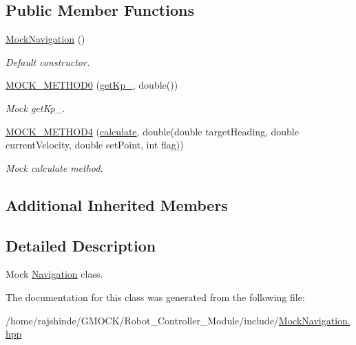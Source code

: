 \subsection*{Public Member Functions}
\begin{DoxyCompactItemize}
\item 
\hyperlink{class_mock_navigation_a54759f67f52b03841f44efe7926fff22}{Mock\+Navigation} ()\hypertarget{class_mock_navigation_a54759f67f52b03841f44efe7926fff22}{}\label{class_mock_navigation_a54759f67f52b03841f44efe7926fff22}

\begin{DoxyCompactList}\small\item\em Default constructor. \end{DoxyCompactList}\item 
\hyperlink{class_mock_navigation_acd53221a46f65f159ad53d22d3db1c51}{M\+O\+C\+K\+\_\+\+M\+E\+T\+H\+O\+D0} (\hyperlink{class_navigation_ab1469d74f4838a9d32a8647d22701f9f}{get\+Kp\+\_\+}, double())\hypertarget{class_mock_navigation_acd53221a46f65f159ad53d22d3db1c51}{}\label{class_mock_navigation_acd53221a46f65f159ad53d22d3db1c51}

\begin{DoxyCompactList}\small\item\em Mock get\+Kp\+\_\+. \end{DoxyCompactList}\item 
\hyperlink{class_mock_navigation_a5189068e3bbe0eeb377a119eaa8f0b62}{M\+O\+C\+K\+\_\+\+M\+E\+T\+H\+O\+D4} (\hyperlink{class_navigation_a0f83b511cec12a68f2c3466c40c5d3cb}{calculate}, double(double target\+Heading, double current\+Velocity, double set\+Point, int flag))\hypertarget{class_mock_navigation_a5189068e3bbe0eeb377a119eaa8f0b62}{}\label{class_mock_navigation_a5189068e3bbe0eeb377a119eaa8f0b62}

\begin{DoxyCompactList}\small\item\em Mock calculate method. \end{DoxyCompactList}\end{DoxyCompactItemize}
\subsection*{Additional Inherited Members}


\subsection{Detailed Description}
Mock \hyperlink{class_navigation}{Navigation} class. 

The documentation for this class was generated from the following file\+:\begin{DoxyCompactItemize}
\item 
/home/rajshinde/\+G\+M\+O\+C\+K/\+Robot\+\_\+\+Controller\+\_\+\+Module/include/\hyperlink{_mock_navigation_8hpp}{Mock\+Navigation.\+hpp}\end{DoxyCompactItemize}
